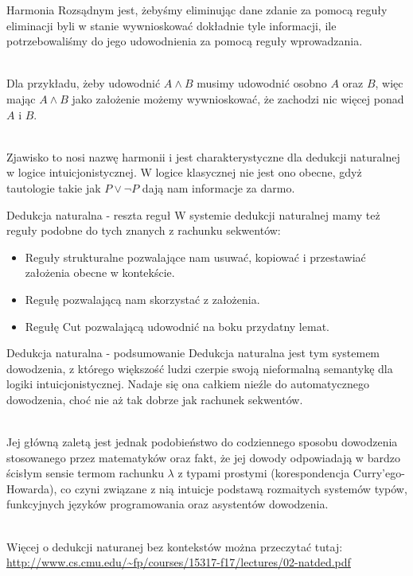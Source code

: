 \documentclass{beamer}
\begin{document}
\begin{frame}{Harmonia}
	Rozsądnym jest, żebyśmy eliminując dane zdanie za pomocą reguły eliminacji byli w stanie wywnioskować dokładnie tyle informacji, ile potrzebowaliśmy do jego udowodnienia za pomocą reguły wprowadzania. \\~\
	
	Dla przykładu, żeby udowodnić $A \land B$ musimy udowodnić osobno $A$ oraz $B$, więc mając $A \land B$ jako założenie możemy wywnioskować, że zachodzi nic więcej ponad $A$ i $B$. \\~\
	
	Zjawisko to nosi nazwę harmonii i jest charakterystyczne dla dedukcji naturalnej w logice intuicjonistycznej. W logice klasycznej nie jest ono obecne, gdyż tautologie takie jak $P \lor \neg P$ dają nam informacje za darmo.
\end{frame}

\begin{frame}{Dedukcja naturalna - reszta reguł}
	W systemie dedukcji naturalnej mamy też reguły podobne do tych znanych z rachunku sekwentów:
	\begin{itemize}
		\item Reguły strukturalne pozwalające nam usuwać, kopiować i przestawiać założenia obecne w kontekście.
		\item Regułę pozwalającą nam skorzystać z założenia.
		\item Regułę Cut pozwalającą udowodnić na boku przydatny lemat.
	\end{itemize}

\end{frame}

\begin{frame}{Dedukcja naturalna - podsumowanie}
	Dedukcja naturalna jest tym systemem dowodzenia, z którego większość ludzi czerpie swoją nieformalną semantykę dla logiki intuicjonistycznej. Nadaje się ona całkiem nieźle do automatycznego dowodzenia, choć nie aż tak dobrze jak rachunek sekwentów. \\~\
	
	Jej główną zaletą jest jednak podobieństwo do codziennego sposobu dowodzenia stosowanego przez matematyków oraz fakt, że jej dowody odpowiadają w bardzo ścisłym sensie termom rachunku $\lambda$ z typami prostymi (korespondencja Curry'ego-Howarda), co czyni związane z nią intuicje podstawą rozmaitych systemów typów, funkcyjnych języków programowania oraz asystentów dowodzenia. \\~\
	
	Więcej o dedukcji naturanej bez kontekstów można przeczytać tutaj: \url{http://www.cs.cmu.edu/~fp/courses/15317-f17/lectures/02-natded.pdf}
\end{frame}
\end{document}
